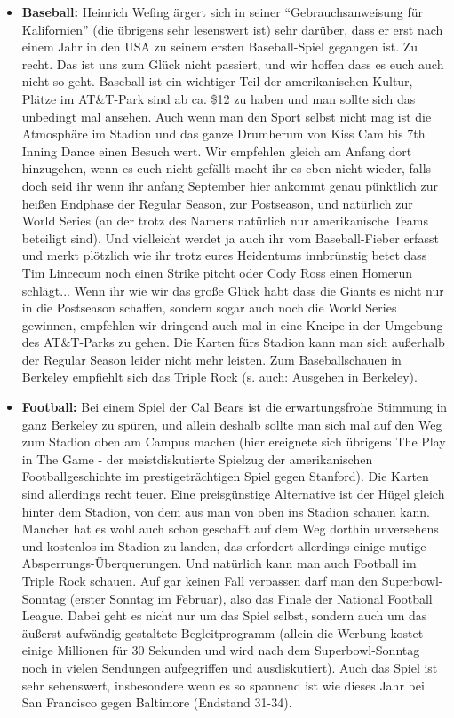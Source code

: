 \documentclass[a4paper]{scrreprt}
\begin{document}
\begin{itemize}

	\item \textbf{Baseball:} Heinrich Wefing ärgert sich in seiner "`Gebrauchsanweisung für Kalifornien"' (die übrigens sehr lesenswert ist) sehr darüber, dass er erst nach einem Jahr in den USA zu seinem ersten Baseball-Spiel gegangen ist. Zu recht. Das ist uns zum Glück nicht passiert, und wir hoffen dass es euch auch nicht so geht. Baseball ist ein wichtiger Teil der amerikanischen Kultur, Plätze im AT\&T-Park sind ab ca. \$12 zu haben und man sollte sich das unbedingt mal ansehen. Auch wenn man den Sport selbst nicht mag ist die Atmosphäre im Stadion und das ganze Drumherum von Kiss Cam bis 7th Inning Dance einen Besuch wert. Wir empfehlen gleich am Anfang dort hinzugehen, wenn es euch nicht gefällt macht ihr es eben nicht wieder, falls doch seid ihr wenn ihr anfang September hier ankommt genau pünktlich zur heißen Endphase der Regular Season, zur Postseason, und natürlich zur World Series (an der trotz des Namens natürlich nur amerikanische Teams beteiligt sind). Und vielleicht werdet ja auch ihr vom Baseball-Fieber erfasst und merkt plötzlich wie ihr trotz eures Heidentums innbrünstig betet dass Tim Lincecum noch einen Strike pitcht oder Cody Ross einen Homerun schlägt... Wenn ihr wie wir das große Glück habt dass die Giants es nicht nur in die Postseason schaffen, sondern sogar auch noch die World Series gewinnen, empfehlen wir dringend auch mal in eine Kneipe in der Umgebung des AT\&T-Parks zu gehen. Die Karten fürs Stadion kann man sich außerhalb der Regular Season leider nicht mehr leisten. Zum Baseballschauen in Berkeley empfiehlt sich das Triple Rock (s. auch: Ausgehen in Berkeley).

	\item \textbf{Football:} Bei einem Spiel der Cal Bears ist die erwartungsfrohe Stimmung in ganz Berkeley zu spüren, und allein deshalb sollte man sich mal auf den Weg zum Stadion oben am Campus machen (hier ereignete sich übrigens The Play in The Game - der meistdiskutierte Spielzug der amerikanischen Footballgeschichte im prestigeträchtigen Spiel gegen Stanford). Die Karten sind allerdings recht teuer. Eine preisgünstige Alternative ist der Hügel gleich hinter dem Stadion, von dem aus man von oben ins Stadion schauen kann. Mancher hat es wohl auch schon geschafft auf dem Weg dorthin unversehens und kostenlos im Stadion zu landen, das erfordert allerdings einige mutige Absperrungs-Überquerungen. Und natürlich kann man auch Football im Triple Rock schauen. Auf gar keinen Fall verpassen darf man den Superbowl-Sonntag (erster Sonntag im Februar), also das Finale der National Football League. Dabei geht es nicht nur um das Spiel selbst, sondern auch um das äußerst aufwändig gestaltete Begleitprogramm (allein die Werbung kostet einige Millionen für 30 Sekunden und wird nach dem Superbowl-Sonntag noch in vielen Sendungen aufgegriffen und ausdiskutiert). Auch das Spiel ist sehr sehenswert, insbesondere wenn es so spannend ist wie dieses Jahr bei San Francisco gegen Baltimore (Endstand 31-34).
	

\end{itemize}
\end{document}
